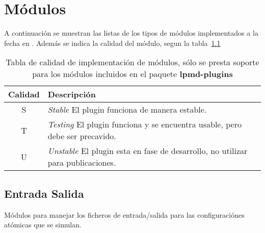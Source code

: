 \appendix

\chapter{M\'odulos}
A continuaci\'on se muestran las listas de los tipos de m\'odulos implementados a la fecha en {\lpmd}. Adem\'as se indica la calidad del m\'odulo, segun la tabla~\ref{tab:modquality}

\begin{table}[h!]
 \begin{tabular}{|c|l|}\hline\hline
 Calidad & Descripci\'on \\\hline\hline
 S & \textit{Stable} El plugin funciona de manera estable. \\
 T & \textit{Testing} El plugin funciona y se encuentra usable, pero debe ser precavido. \\
 U & \textit{Unstable} El plugin esta en fase de desarrollo, no utilizar para publicaciones. \\
\hline
 \end{tabular}
 \label{tab:modquality}
 \caption{Tabla de calidad de implementaci\'on de m\'odulos, s\'olo se presta soporte para los m\'odulos incluidos en el paquete \textbf{lpmd-plugins}}
\end{table}

\section{Entrada Salida}
M\'odulos para manejar los ficheros de entrada/salida para las configuraci\'ones at\'omicas que se simulan.

